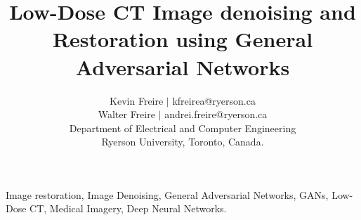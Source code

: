 \documentclass[journal]{IEEEtran}
\begin{document}
\title{Low-Dose CT Image denoising and Restoration using General Adversarial Networks}

\author{Kevin Freire $|$ kfreirea@ryerson.ca\\
Walter Freire $|$ andrei.freire@ryerson.ca \\
Department of Electrical and Computer Engineering\\
Ryerson University, Toronto, Canada.}
\maketitle


\begin{abstract}



\end{abstract}

\begin{IEEEkeywords}
Image restoration, Image Denoising, General Adversarial Networks, GANs, Low-Dose CT, Medical Imagery, Deep Neural Networks.
\end{IEEEkeywords}

\end{document}
